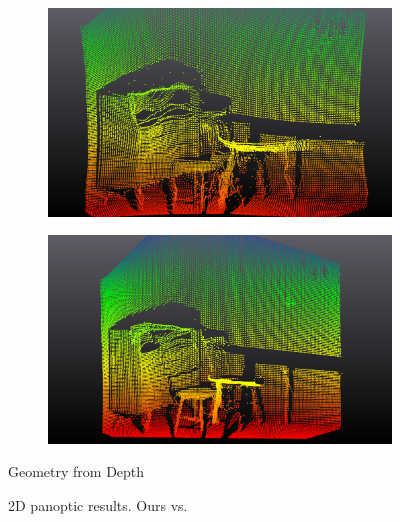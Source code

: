 \begin{figure}[t]
  \vspace{0.04\linewidth} %

  \begin{subfigure}{0.45\linewidth}
    \centering
    \includegraphics[width=\linewidth]{figs/depthply_ours.png}
    \label{subfig:sub3}
  \end{subfigure}
  \hspace{0.05\linewidth} %
  \begin{subfigure}{0.45\linewidth}
    \centering
    \includegraphics[width=\linewidth]{figs/depthply_pan.png}
    \label{subfig:sub4}
  \end{subfigure}
   \vspace*{-3mm} %
   \caption*{Geometry from Depth}

  \caption{2D panoptic results. Ours vs. \citet{dahnert2021panoptic}}
  \label{fig:qual_panoptic}
\end{figure}

